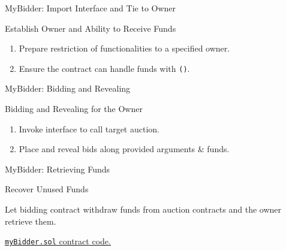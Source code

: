 \documentclass[handout]{beamer}
\begin{document}
\begin{frame}{MyBidder: Import Interface and Tie to Owner}

\begin{samplecode}{Establish Owner and Ability to Receive Funds}
	
\end{samplecode}
\begin{enumerate}
	\item	Prepare restriction of functionalities to a specified owner.
	\item	Ensure the contract can handle funds with \texttt{()}.
\end{enumerate}

\end{frame}

\begin{frame}{MyBidder: Bidding and Revealing}

\begin{samplecode}{Bidding and Revealing for the Owner}
	
\end{samplecode}
\begin{enumerate}
	\item	Invoke interface to call target auction.
	\item	Place and reveal bids along provided arguments \& funds.
\end{enumerate}

\end{frame}

\begin{frame}{MyBidder: Retrieving Funds}

\begin{samplecode}{Recover Unused Funds}
	
\end{samplecode}

\vspace{1em}
Let bidding contract withdraw funds from auction contracts and the owner retrieve them.

\vspace{1em}

\link \href{https://raw.githubusercontent.com/cifunibas/Smart-Contracts-DeFi/main/contracts/myBidder.sol}{\texttt{myBidder.sol} contract code.}

\end{frame}
\end{document}
